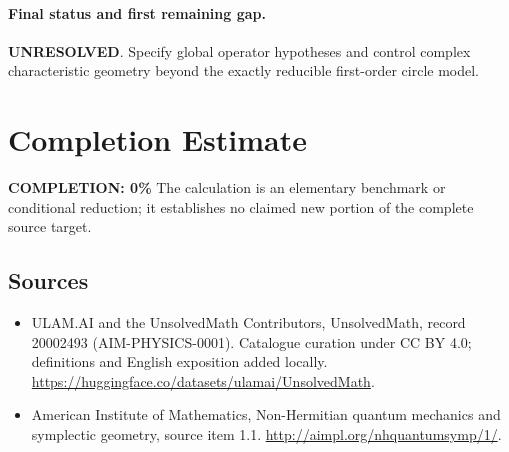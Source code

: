 \documentclass[11pt]{article}
\begin{document}
\paragraph{Final status and first remaining gap.}
\textbf{UNRESOLVED}. Specify global operator hypotheses and control complex characteristic geometry beyond the exactly reducible first-order circle model.

\section{Completion Estimate}
\noindent\textbf{COMPLETION: 0\%}
The calculation is an elementary benchmark or conditional reduction; it establishes no claimed new portion of the complete source target.

\subsection{Sources}
\begin{itemize}
\item[\hypertarget{source:20002493:1}{S1}] ULAM.AI and the UnsolvedMath Contributors, UnsolvedMath, record 20002493 (AIM-PHYSICS-0001). Catalogue curation under CC BY 4.0; definitions and English exposition added locally.
\url{https://huggingface.co/datasets/ulamai/UnsolvedMath}.
\item[\hypertarget{source:20002493:2}{S2}] American Institute of Mathematics, Non-Hermitian quantum mechanics and symplectic geometry, source item 1.1.
\url{http://aimpl.org/nhquantumsymp/1/}.
\end{itemize}
\label{end:20002493}
\end{document}
